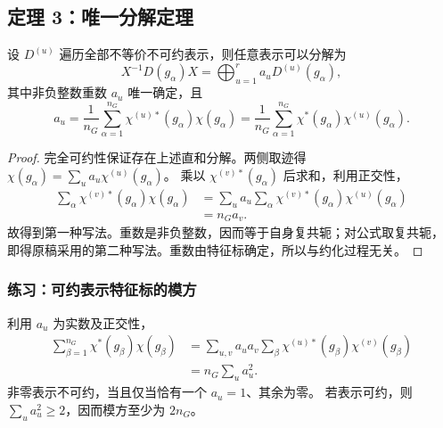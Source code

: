 \subsection{定理 3：唯一分解定理}
\begin{theorem}
设 $D^{\left(u\right)}$ 遍历全部不等价不可约表示，则任意表示可以分解为
\begin{equation}
X^{-1}D\left(g_\alpha\right)X=\bigoplus_{u=1}^{r}a_uD^{\left(u\right)}\left(g_\alpha\right),
\end{equation}
其中非负整数重数 $a_u$ 唯一确定，且
\begin{equation}
a_u=\frac1{n_G}\sum_{\alpha=1}^{n_G}\chi^{\left(u\right)*}\left(g_\alpha\right)\chi\left(g_\alpha\right)
=\frac1{n_G}\sum_{\alpha=1}^{n_G}\chi^*\left(g_\alpha\right)\chi^{\left(u\right)}\left(g_\alpha\right).
\end{equation}
\end{theorem}
\begin{proof}
完全可约性保证存在上述直和分解。两侧取迹得
$\chi\left(g_\alpha\right)=\sum_u a_u\chi^{\left(u\right)}\left(g_\alpha\right)$。
乘以 $\chi^{\left(v\right)*}\left(g_\alpha\right)$ 后求和，利用正交性，
\begin{align}
\sum_\alpha\chi^{\left(v\right)*}\left(g_\alpha\right)\chi\left(g_\alpha\right)
&=\sum_u a_u\sum_\alpha\chi^{\left(v\right)*}\left(g_\alpha\right)\chi^{\left(u\right)}\left(g_\alpha\right)\\
&=n_Ga_v.
\end{align}
故得到第一种写法。重数是非负整数，因而等于自身复共轭；对公式取复共轭，
即得原稿采用的第二种写法。重数由特征标确定，所以与约化过程无关。
\end{proof}

\subsubsection*{练习：可约表示特征标的模方}
利用 $a_u$ 为实数及正交性，
\begin{align}
\sum_{\beta=1}^{n_G}\chi^*\left(g_\beta\right)\chi\left(g_\beta\right)
&=\sum_{u,v}a_ua_v\sum_\beta\chi^{\left(u\right)*}\left(g_\beta\right)\chi^{\left(v\right)}\left(g_\beta\right)\\
&=n_G\sum_u a_u^2.
\end{align}
非零表示不可约，当且仅当恰有一个 $a_u=1$、其余为零。
若表示可约，则 $\sum_u a_u^2\geq2$，因而模方至少为 $2n_G$。

